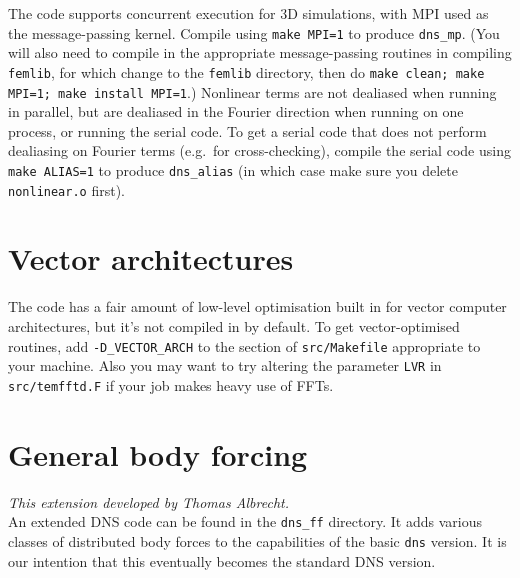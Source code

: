 \documentclass[11pt,a4paper]{report}
\begin{document}
The code supports concurrent execution for 3D simulations, with MPI
used as the message-passing kernel. Compile using \verb+make MPI=1+ to
produce \verb+dns_mp+. (You will also need to compile in the
appropriate message-passing routines in compiling \verb+femlib+, for
which change to the \verb+femlib+ directory, then do
\verb+make clean; make MPI=1; make install MPI=1+.)  Nonlinear terms
are not dealiased when running in parallel, but are dealiased in the
Fourier direction when running on one process, or running the serial
code. To get a serial code that does not perform dealiasing on Fourier
terms (e.g.\ for cross-checking), compile the serial code using
\verb+make ALIAS=1+ to produce \verb+dns_alias+ (in which case make
sure you delete \verb+nonlinear.o+ first).

\section{Vector architectures}
\label{sec.vector}

The code has a fair amount of low-level optimisation built in for
vector computer architectures, but it's not compiled in by default. To
get vector-optimised routines, add \verb+-D_VECTOR_ARCH+ to the
section of \texttt{src/Makefile} appropriate to your machine. Also you
may want to try altering the parameter \texttt{LVR} in
\texttt{src/temfftd.F} if your job makes heavy use of FFTs.

\section{General body forcing}
\label{sec.dns_ff}

\textsl{This extension developed by Thomas Albrecht.}\\

\noindent
An extended DNS code can be found in the \verb+dns_ff+ directory. It
adds various classes of distributed body forces to the capabilities of
the basic \verb+dns+ version.  It is our intention that this
eventually becomes the standard DNS version.
\end{document}

